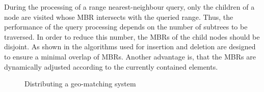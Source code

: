 During the processing of a range nearest-neighbour query, only the children of a node are visited whose MBR intersects with the queried range. Thus, the performance of the query processing depends on the number of subtrees to be traversed. In order to reduce this number, the MBRs of the child nodes should be disjoint. As shown in \cite{Beckmann1990TRA} the algorithms used for insertion and deletion are designed to ensure a minimal overlap of MBRs. Another advantage is, that the MBRs are dynamically adjusted according to the currently contained elements.

\begin{figure}[htbp]
\centering
{}
\caption{Distributing a geo-matching system}\label{fig:DistributedRtree}
\end{figure}

